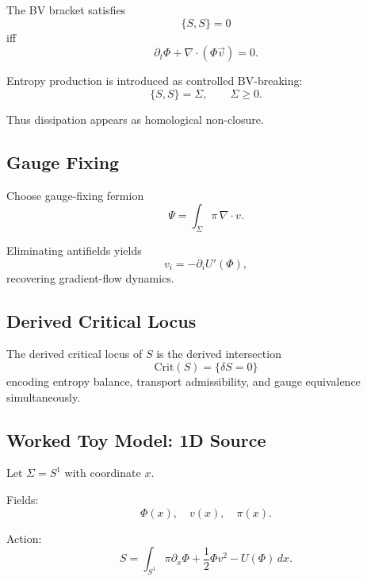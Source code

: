 \documentclass[11pt]{article}
\begin{document}
The BV bracket satisfies
\begin{equation}
\{S,S\} = 0
\end{equation}
iff
\begin{equation}
\partial_t \Phi + \nabla \cdot (\Phi \vec{v}) = 0.
\end{equation}

Entropy production is introduced as controlled BV-breaking:
\begin{equation}
\{S,S\} = \Sigma,
\qquad
\Sigma \ge 0.
\end{equation}

Thus dissipation appears as homological non-closure.

\subsection*{Gauge Fixing}

Choose gauge-fixing fermion
\begin{equation}
\Psi = \int_\Sigma \pi\, \nabla \cdot v.
\end{equation}

Eliminating antifields yields
\begin{equation}
v_i = -\partial_i U'(\Phi),
\end{equation}
recovering gradient-flow dynamics.

\subsection*{Derived Critical Locus}

The derived critical locus of $S$ is the derived intersection
\begin{equation}
\mathrm{Crit}(S)
=
\{ \delta S = 0 \}
\end{equation}
encoding entropy balance, transport admissibility,
and gauge equivalence simultaneously.

\subsection*{Worked Toy Model: 1D Source}

Let $\Sigma = S^1$ with coordinate $x$.

Fields:
\[
\Phi(x), \quad v(x), \quad \pi(x).
\]

Action:
\begin{equation}
S
=
\int_{S^1}
\pi \partial_x \Phi
+
\frac{1}{2}\Phi v^2
-
U(\Phi)\, dx.
\end{equation}
\end{document}
